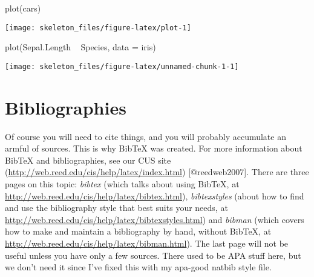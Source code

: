 \documentclass[12pt,twoside]{reedthesis}
\begin{document}
  \begin{CodeChunk}
  \begin{CodeInput}
  plot(cars)
  \end{CodeInput}


  \begin{center}\texttt{[image: skeleton\_files/figure-latex/plot-1]} \end{center}

  \end{CodeChunk}

  \begin{CodeChunk}
  \begin{CodeInput}
  plot(Sepal.Length ~ Species, data = iris)
  \end{CodeInput}


  \begin{center}\texttt{[image: skeleton\_files/figure-latex/unnamed-chunk-1-1]} \end{center}

  \end{CodeChunk}

  \section{Bibliographies}

  Of course you will need to cite things, and you will probably accumulate
  an armful of sources. This is why BibTeX was created. For more
  information about BibTeX and bibliographies, see our CUS site
  (\url{http://web.reed.edu/cis/help/latex/index.html})\cite{reedweb2007}
  {[}@reedweb2007{]}. There are three pages on this topic: \emph{bibtex}
  (which talks about using BibTeX, at
  \url{http://web.reed.edu/cis/help/latex/bibtex.html}),
  \emph{bibtexstyles} (about how to find and use the bibliography style
  that best suits your needs, at
  \url{http://web.reed.edu/cis/help/latex/bibtexstyles.html}) and
  \emph{bibman} (which covers how to make and maintain a bibliography by
  hand, without BibTeX, at
  \url{http://web.reed.edu/cis/help/latex/bibman.html}). The last page
  will not be useful unless you have only a few sources. There used to be
  APA stuff here, but we don't need it since I've fixed this with my
  apa-good natbib style file.

\printbibliography

\end{document}
